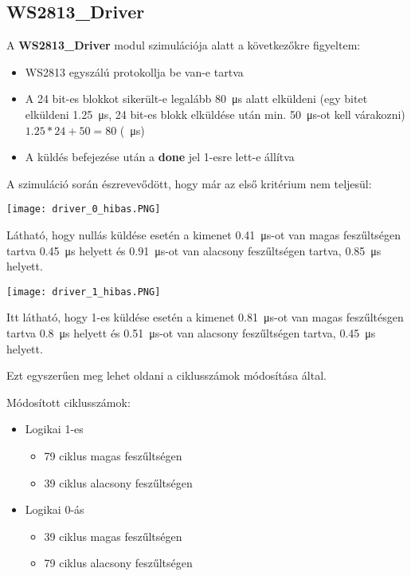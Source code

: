 \subsection{WS2813\_Driver}

A \textbf{WS2813\_Driver} modul szimulációja alatt a következőkre figyeltem:
\begin{itemize}
	\item WS2813 egyszálú protokollja be van-e tartva
	\item A 24 bit-es blokkot sikerült-e legalább \SI{80}{\micro\second} alatt elküldeni (egy bitet elküldeni \SI{1.25}{\micro\second}, 24 bit-es blokk elküldése után min. \SI{50}{\micro\second}-ot kell várakozni) $1.25 * 24 + 50 = 80$ (\SI{}{\micro\second})
	\item A küldés befejezése után a \textbf{done} jel 1-esre lett-e állítva
\end{itemize}

\tab A szimuláció során észrevevődött, hogy már az első kritérium nem teljesül:

\texttt{[image: driver\_0\_hibas.PNG]}

\tab Látható, hogy nullás küldése esetén a kimenet \SI{0.41}{\micro\second}-ot van magas feszűltségen tartva \SI{0.45}{\micro\second} helyett és \SI{0.91}{\micro\second}-ot van
alacsony feszűltségen tartva, \SI{0.85}{\micro\second} helyett.

\texttt{[image: driver\_1\_hibas.PNG]}

\tab Itt látható, hogy 1-es küldése esetén a kimenet \SI{0.81}{\micro\second}-ot van magas feszűltésgen tartva \SI{0.8}{\micro\second} helyett és \SI{0.51}{\micro\second}-ot van
alacsony feszűltségen tartva, \SI{0.45}{\micro\second} helyett.

Ezt egyszerűen meg lehet oldani a ciklusszámok módosítása által.

Módosított ciklusszámok:

\begin{itemize}
\item Logikai 1-es
	\begin{itemize}
	\item 79 ciklus magas feszűltségen
	\item 39 ciklus alacsony feszűltségen
	\end{itemize}
\item Logikai 0-ás
	\begin{itemize}
	\item 39 ciklus magas feszűltségen
	\item 79 ciklus alacsony feszűltségen
	\end{itemize}
\end{itemize}

